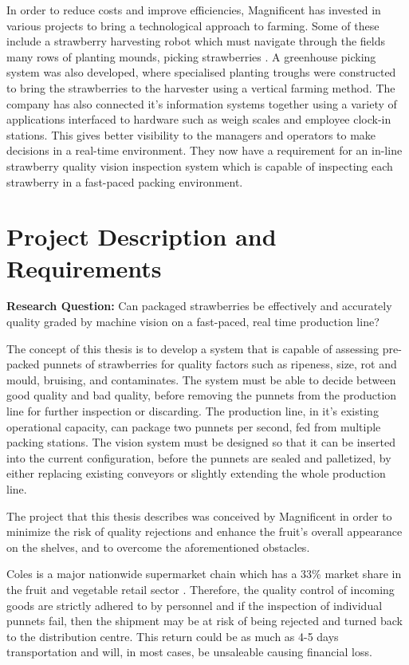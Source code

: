 \documentclass[fleqn,twoside,12pt]{report}
\begin{document}
In order to reduce costs and improve efficiencies, Magnificent has invested in various projects to bring a technological approach to farming. Some of these include a strawberry harvesting robot which must navigate through the fields many rows of planting mounds, picking strawberries \cite{busch}. A greenhouse picking system was also developed, where specialised planting troughs were constructed to bring the strawberries to the harvester using a vertical farming method. The company has also connected it's information systems together using a variety of applications interfaced to hardware such as weigh scales and employee clock-in stations. This gives better visibility to the managers and operators to make decisions in a real-time environment. They now have a requirement for an in-line strawberry quality vision inspection system which is capable of inspecting each strawberry in a fast-paced packing environment.



\section{Project Description and Requirements}
\label{sec:requirements}

\textbf{Research Question:} Can packaged strawberries be effectively and accurately quality graded by machine vision on a fast-paced, real time production line?

The concept of this thesis is to develop a system that is capable of assessing pre-packed punnets of strawberries for quality factors such as ripeness, size, rot and mould, bruising, and contaminates. The system must be able to decide between good quality and bad quality, before removing the punnets from the production line for further inspection or discarding. The production line, in it's existing operational capacity, can package two punnets per second, fed from multiple packing stations. The vision system must be designed so that it can be inserted into the current configuration, before the punnets are sealed and palletized, by either replacing existing conveyors or slightly extending the whole production line. 

The project that this thesis describes was conceived by Magnificent in order to minimize the risk of quality rejections and enhance the fruit's overall appearance on the shelves, and to overcome the aforementioned obstacles.

Coles is a major nationwide supermarket chain which has a 33\% market share in the fruit and vegetable retail sector \cite{roymorgan}. Therefore, the quality control of incoming goods are strictly adhered to by personnel and if the inspection of individual punnets fail, then the shipment may be at risk of being rejected and turned back to the distribution centre. This return could be as much as 4-5 days transportation and will, in most cases, be unsaleable causing financial loss.
\end{document}
